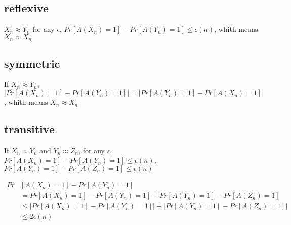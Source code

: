 \documentclass[onecolumn,oneside]{SUSTechHomework}
\begin{document}
  \subsection*{reflexive}
  $X_n \approx Y_n$ for any $\epsilon$, $Pr[A(X_n)=1]-Pr[A(Y_n)=1] \le \epsilon(n)$, whith means $X_n \approx X_n$
  \subsection*{symmetric}
  If $X_n \approx Y_n$, $|Pr[A(X_n)=1]-Pr[A(Y_n)=1]|=|Pr[A(Y_n)=1]-Pr[A(X_n)=1]|$, whith means $X_n \approx X_n$
  \subsection*{transitive}
  If $X_n \approx Y_n$ and $Y_n \approx Z_n$, for any $\epsilon$, $Pr[A(X_n)=1]-Pr[A(Y_n)=1] \le \epsilon(n)$, $Pr[A(Y_n)=1]-Pr[A(Z_n)=1] \le \epsilon(n)$

  \begin{align*}
    Pr&[A(X_n)=1]-Pr[A(Y_n)=1] \\
   &= Pr[A(X_n)=1]-Pr[A(Y_n)=1] + Pr[A(Y_n)=1]-Pr[A(Z_n)=1]  \\
   &\le |Pr[A(X_n)=1]-Pr[A(Y_n)=1]| + |Pr[A(Y_n)=1]-Pr[A(Z_n)=1]|  \\
   &\le 2\epsilon(n)
  \end{align*}
\end{document}
